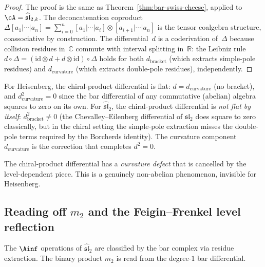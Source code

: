 \begin{proof}
The proof is the same as Theorem~\ref{thm:bar-swiss-cheese},
applied to $\cA = \widehat{\mathfrak{sl}}_{2,k}$. The
deconcatenation coproduct
$\Delta[a_1|\cdots|a_n]
= \sum_{i=0}^{n} [a_1|\cdots|a_i] \otimes [a_{i+1}|\cdots|a_n]$
is the tensor coalgebra structure, coassociative by construction.
The differential~$d$ is a coderivation of~$\Delta$ because
collision residues in~$\mathbb{C}$ commute with interval splitting
in~$\mathbb{R}$: the Leibniz rule
$d \circ \Delta
= (\mathrm{id} \otimes d + d \otimes \mathrm{id}) \circ \Delta$
holds for both $d_{\mathrm{bracket}}$ (which extracts simple-pole
residues) and $d_{\mathrm{curvature}}$ (which extracts double-pole
residues), independently.
\end{proof}

\begin{remark}
\label{rem:rosetta-sl2-curvature-obstruction}
For Heisenberg, the chiral-product differential is flat:
$d = d_{\mathrm{curvature}}$ (no bracket), and
$d_{\mathrm{curvature}}^2 = 0$ since the bar differential of any
commutative (abelian) algebra squares to zero on its own. For
$\widehat{\mathfrak{sl}}_2$, the chiral-product differential is
\emph{not flat by itself}: $d_{\mathrm{bracket}}^2 \neq 0$
(the Chevalley--Eilenberg differential of $\mathfrak{sl}_2$ does
square to zero classically, but in the chiral setting the simple-pole
extraction misses the double-pole terms required by the Borcherds
identity). The curvature component $d_{\mathrm{curvature}}$ is
the correction that completes $d^2 = 0$.

The chiral-product differential has a
\emph{curvature defect} that is cancelled by the level-dependent
piece. This is a genuinely non-abelian phenomenon, invisible for
Heisenberg.
\end{remark}


\subsection{\texorpdfstring{Reading off $m_2$ and the Feigin--Frenkel level reflection}{Reading off m2 and the Feigin--Frenkel level reflection}}
\label{subsec:rosetta-operations}

The $\Ainf$ operations of
$\widehat{\mathfrak{sl}}_2$ are classified by the bar complex via residue extraction. The binary
product $m_2$ is read from the degree-$1$ bar differential.

